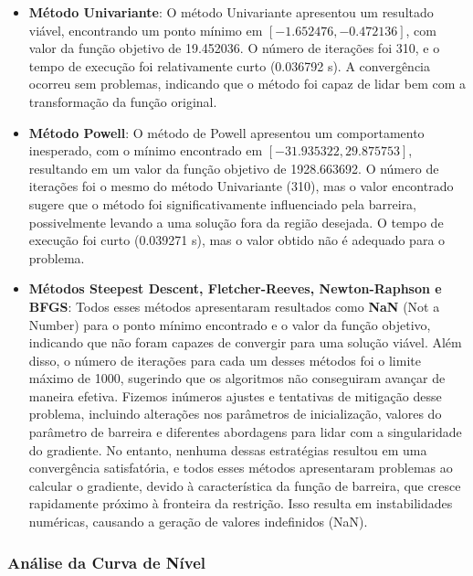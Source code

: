 \documentclass[a4paper, 12pt]{article}
\begin{document}
\begin{itemize}
    \item \textbf{Método Univariante}: O método Univariante apresentou um resultado viável, encontrando um ponto mínimo em \([-1.652476, -0.472136]\), com valor da função objetivo de 19.452036. O número de iterações foi 310, e o tempo de execução foi relativamente curto (0.036792 s). A convergência ocorreu sem problemas, indicando que o método foi capaz de lidar bem com a transformação da função original.
    
    \item \textbf{Método Powell}: O método de Powell apresentou um comportamento inesperado, com o mínimo encontrado em \([-31.935322, 29.875753]\), resultando em um valor da função objetivo de 1928.663692. O número de iterações foi o mesmo do método Univariante (310), mas o valor encontrado sugere que o método foi significativamente influenciado pela barreira, possivelmente levando a uma solução fora da região desejada. O tempo de execução foi curto (0.039271 s), mas o valor obtido não é adequado para o problema.
    
    \item \textbf{Métodos Steepest Descent, Fletcher-Reeves, Newton-Raphson e BFGS}: Todos esses métodos apresentaram resultados como \textbf{NaN} (Not a Number) para o ponto mínimo encontrado e o valor da função objetivo, indicando que não foram capazes de convergir para uma solução viável. Além disso, o número de iterações para cada um desses métodos foi o limite máximo de 1000, sugerindo que os algoritmos não conseguiram avançar de maneira efetiva. Fizemos inúmeros ajustes e tentativas de mitigação desse problema, incluindo alterações nos parâmetros de inicialização, valores do parâmetro de barreira e diferentes abordagens para lidar com a singularidade do gradiente. No entanto, nenhuma dessas estratégias resultou em uma convergência satisfatória, e todos esses métodos apresentaram problemas ao calcular o gradiente, devido à característica da função de barreira, que cresce rapidamente próximo à fronteira da restrição. Isso resulta em instabilidades numéricas, causando a geração de valores indefinidos (NaN).

\end{itemize}

\subsubsection{Análise da Curva de Nível}
\end{document}
